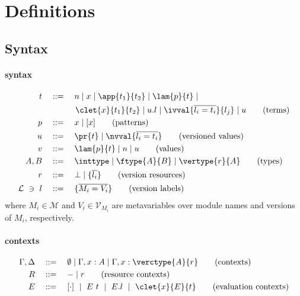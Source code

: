 \section{\corelang{} Definitions}

\subsection{\corelang{} Syntax}

\paragraph{\textnormal{\textbf{\corelang{} syntax}}}
\begin{align*}
t      \quad&::=\quad n \mid x \mid \app{t_1}{t_2} \mid \lam{p}{t} \mid \\
            &\hspace{2em}\quad \clet{x}{t_1}{t_2} \mid u.l \mid \ivval{\overline{l_i=t_i}}{l_j} \mid u\tag{terms}\\
p      \quad&::=\quad x \mid  [x] \tag{patterns}\\
u      \quad&::=\quad \pr{t} \mid \nvval{\overline{l_i=t_i}} \tag{versioned values}\\
v      \quad&::=\quad \lam{p}{t} \mid n \mid u \tag{values}\\
A, B   \quad&::=\quad \inttype \mid \ftype{A}{B} \mid \vertype{r}{A} \tag{types}\\
r      \quad&::=\quad \bot \mid \{\overline{l_i}\} \tag{version resources}\\
\mathcal{L}\ \ni\ l\quad&::=\quad \{\overline{M_i = V_i}\} \tag{version labels}
\end{align*}
where $M_i\in\mathcal{M}$ and $V_i\in\mathcal{V}_{M_i}$ are metavariables over module names and versions of $M_i$, respectively.

\paragraph{\textnormal{\textbf{\corelang{} contexts}}}
\begin{align*}
\Gamma,\Delta \quad&::=\quad \emptyset \mid \Gamma, x:A \mid \Gamma, x:\verctype{A}{r} \tag{contexts}\\
R      \quad&::=\quad - \mid r \tag{resource contexts}\\
E      \quad&::=\quad [\cdot]\ \mid\ E\ t \ \mid\ E.l\ \mid\ \clet{x}{E}{t} \tag{evaluation contexts}
\end{align*}

